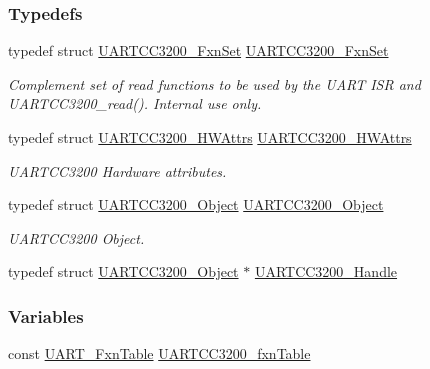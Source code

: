 \subsubsection*{Typedefs}
\begin{DoxyCompactItemize}
\item 
typedef struct \hyperlink{struct_u_a_r_t_c_c3200___fxn_set}{U\+A\+R\+T\+C\+C3200\+\_\+\+Fxn\+Set} \hyperlink{_u_a_r_t_c_c3200_8h_a752d0ee3dd233dc675dd2338f365f3df}{U\+A\+R\+T\+C\+C3200\+\_\+\+Fxn\+Set}
\begin{DoxyCompactList}\small\item\em Complement set of read functions to be used by the U\+A\+R\+T I\+S\+R and U\+A\+R\+T\+C\+C3200\+\_\+read(). Internal use only. \end{DoxyCompactList}\item 
typedef struct \hyperlink{struct_u_a_r_t_c_c3200___h_w_attrs}{U\+A\+R\+T\+C\+C3200\+\_\+\+H\+W\+Attrs} \hyperlink{_u_a_r_t_c_c3200_8h_a4314d1c1487378758af75f900158e582}{U\+A\+R\+T\+C\+C3200\+\_\+\+H\+W\+Attrs}
\begin{DoxyCompactList}\small\item\em U\+A\+R\+T\+C\+C3200 Hardware attributes. \end{DoxyCompactList}\item 
typedef struct \hyperlink{struct_u_a_r_t_c_c3200___object}{U\+A\+R\+T\+C\+C3200\+\_\+\+Object} \hyperlink{_u_a_r_t_c_c3200_8h_ab955379efacdd1121191c43ef60c6389}{U\+A\+R\+T\+C\+C3200\+\_\+\+Object}
\begin{DoxyCompactList}\small\item\em U\+A\+R\+T\+C\+C3200 Object. \end{DoxyCompactList}\item 
typedef struct \hyperlink{struct_u_a_r_t_c_c3200___object}{U\+A\+R\+T\+C\+C3200\+\_\+\+Object} $\ast$ \hyperlink{_u_a_r_t_c_c3200_8h_a7918e9066f5ecdeaba9075bf4fe71157}{U\+A\+R\+T\+C\+C3200\+\_\+\+Handle}
\end{DoxyCompactItemize}
\subsubsection*{Variables}
\begin{DoxyCompactItemize}
\item 
const \hyperlink{struct_u_a_r_t___fxn_table}{U\+A\+R\+T\+\_\+\+Fxn\+Table} \hyperlink{_u_a_r_t_c_c3200_8h_af5c9fcf73d2540d179ec24ef172f1299}{U\+A\+R\+T\+C\+C3200\+\_\+fxn\+Table}
\end{DoxyCompactItemize}



